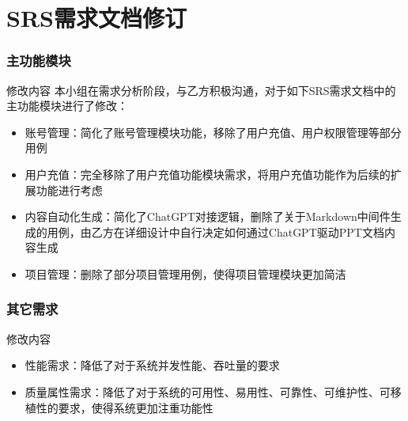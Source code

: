 %
%
%
%
\section{SRS需求文档修订}
\begin{frame}
    \frametitle{主功能模块}
    \footnotesize
    \begin{block}{修改内容}
        本小组在需求分析阶段，与乙方积极沟通，对于如下SRS需求文档中的主功能模块进行了修改：
        \begin{itemize}
            \item 账号管理：简化了账号管理模块功能，移除了用户充值、用户权限管理等部分用例
            \item 用户充值：完全移除了用户充值功能模块需求，将用户充值功能作为后续的扩展功能进行考虑
            \item 内容自动化生成：简化了ChatGPT对接逻辑，删除了关于Markdown中间件生成的用例，由乙方在详细设计中自行决定如何通过ChatGPT驱动PPT文档内容生成
            \item 项目管理：删除了部分项目管理用例，使得项目管理模块更加简洁
        \end{itemize}
    \end{block}
\end{frame}

\begin{frame}
    \frametitle{其它需求}
    \footnotesize
    \begin{block}{修改内容}
        \begin{itemize}
            \item 性能需求：降低了对于系统并发性能、吞吐量的要求
            \item 质量属性需求：降低了对于系统的可用性、易用性、可靠性、可维护性、可移植性的要求，使得系统更加注重功能性
        \end{itemize}
    \end{block}
\end{frame}



